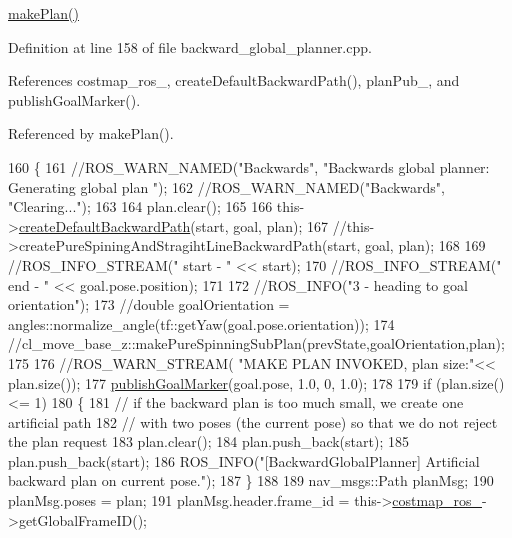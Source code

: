 \hyperlink{classcl__move__base__z_1_1backward__global__planner_1_1BackwardGlobalPlanner_a3f1f3c81e7c52c9305544fd793741a41}{make\+Plan()} 

Definition at line 158 of file backward\+\_\+global\+\_\+planner.\+cpp.



References costmap\+\_\+ros\+\_\+, create\+Default\+Backward\+Path(), plan\+Pub\+\_\+, and publish\+Goal\+Marker().



Referenced by make\+Plan().


\begin{DoxyCode}
160 \{
161     \textcolor{comment}{//ROS\_WARN\_NAMED("Backwards", "Backwards global planner: Generating global plan ");}
162     \textcolor{comment}{//ROS\_WARN\_NAMED("Backwards", "Clearing...");}
163 
164     plan.clear();
165 
166     this->\hyperlink{classcl__move__base__z_1_1backward__global__planner_1_1BackwardGlobalPlanner_a1b4d2eb717f9f63f2309def37c6ce297}{createDefaultBackwardPath}(start, goal, plan);
167     \textcolor{comment}{//this->createPureSpiningAndStragihtLineBackwardPath(start, goal, plan);}
168 
169     \textcolor{comment}{//ROS\_INFO\_STREAM(" start - " << start);}
170     \textcolor{comment}{//ROS\_INFO\_STREAM(" end - " << goal.pose.position);}
171 
172     \textcolor{comment}{//ROS\_INFO("3 - heading to goal orientation");}
173     \textcolor{comment}{//double goalOrientation = angles::normalize\_angle(tf::getYaw(goal.pose.orientation));}
174     \textcolor{comment}{//cl\_move\_base\_z::makePureSpinningSubPlan(prevState,goalOrientation,plan);}
175 
176     \textcolor{comment}{//ROS\_WARN\_STREAM( "MAKE PLAN INVOKED, plan size:"<< plan.size());}
177     \hyperlink{classcl__move__base__z_1_1backward__global__planner_1_1BackwardGlobalPlanner_a3c6784cad10fdadf28323380fe3d6d2b}{publishGoalMarker}(goal.pose, 1.0, 0, 1.0);
178 
179     \textcolor{keywordflow}{if} (plan.size() <= 1)
180     \{
181         \textcolor{comment}{// if the backward plan is too much small, we create one artificial path}
182         \textcolor{comment}{// with two poses (the current pose) so that we do not reject the plan request        }
183         plan.clear();
184         plan.push\_back(start);
185         plan.push\_back(start);
186         ROS\_INFO(\textcolor{stringliteral}{"[BackwardGlobalPlanner] Artificial backward plan on current pose."});
187     \}
188 
189     nav\_msgs::Path planMsg;
190     planMsg.poses = plan;
191     planMsg.header.frame\_id = this->\hyperlink{classcl__move__base__z_1_1backward__global__planner_1_1BackwardGlobalPlanner_a7103c15e6540a514acd421c3c6e194a4}{costmap\_ros\_}->getGlobalFrameID();

\end{DoxyCode}
